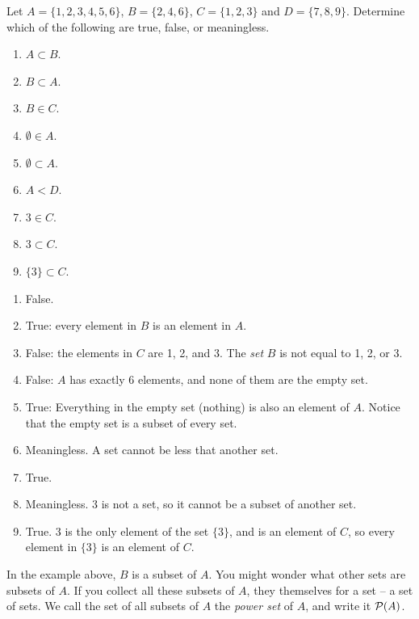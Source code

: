 \documentclass[12pt]{article}
\begin{document}
\begin{example}
 Let $A = \{1, 2, 3, 4, 5, 6\}$, $B = \{2, 4, 6\}$, $C = \{1, 2, 3\}$ and $D = \{7, 8, 9\}$.  Determine which of the following are true, false, or meaningless.
\begin{multicols}{3}
\begin{enumerate}
\item $A \subset B$.
\item $B \subset A$.
\item $B \in C$.
\item $\emptyset \in A$.
\item $\emptyset \subset A$.
\item $A < D$.
\item $3 \in C$.
\item $3 \subset C$.
\item $\{3\} \subset C$.
\end{enumerate}
\end{multicols}
\begin{solution}
 \begin{enumerate}
  \item False.
\item True: every element in $B$ is an element in $A$.
\item False: the elements in $C$ are 1, 2, and 3.  The \emph{set} $B$ is not equal to 1, 2, or 3.
\item False: $A$ has exactly 6 elements, and none of them are the empty set.
\item True: Everything in the empty set (nothing) is also an element of $A$.  Notice that the empty set is a subset of every set.
\item Meaningless.  A set cannot be less that another set.
\item True.
\item Meaningless.  $3$ is not a set, so it cannot be a subset of another set.
\item True.  $3$ is the only element of the set $\{3\}$, and is an element of $C$, so every element in $\{3\}$ is an element of $C$.
 \end{enumerate}
\end{solution}
\end{example}

In the example above, $B$ is a subset of $A$.  You might wonder what other sets are subsets of $A$.  If you collect all these subsets of $A$, they themselves for a set -- a set of sets.  We call the set of all subsets of $A$ the \emph{power set} of $A$, and write it $\mathcal P(A)$.
\end{document}
